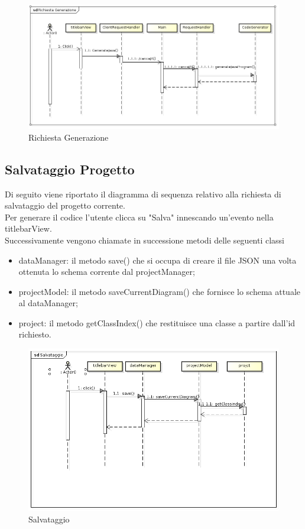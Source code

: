 \documentclass[../DefinizioneDiProdotto.tex]{subfiles}
\begin{document}
\begin{figure}[H]\label{fig:RichiestaGenerazione}
	\centering
	\includegraphics[scale=0.46]{Immagini/RichiestaGenerazione.png}
	\caption{Richiesta Generazione}
\end{figure}

\subsection{Salvataggio Progetto}
Di seguito viene riportato il diagramma di sequenza relativo alla richiesta di salvataggio del progetto corrente.\\
Per generare il codice l'utente clicca su "Salva" innescando un'evento nella titlebarView.\\
Successivamente vengono chiamate in successione metodi delle seguenti classi
\begin{itemize}
	\item dataManager: il metodo save() che si occupa di creare il file JSON una volta ottenuta lo schema corrente dal projectManager;
	\item projectModel: il metodo saveCurrentDiagram() che fornisce lo schema attuale al dataManager;
	\item project: il metodo getClassIndex() che restituisce una classe a partire dall'id richiesto.
\end{itemize}

\begin{figure}[H]\label{fig:Salvataggio}
	\centering
	\includegraphics[scale=0.46]{Immagini/salvataggio.png}
	\caption{Salvataggio}
\end{figure}
\end{document}
